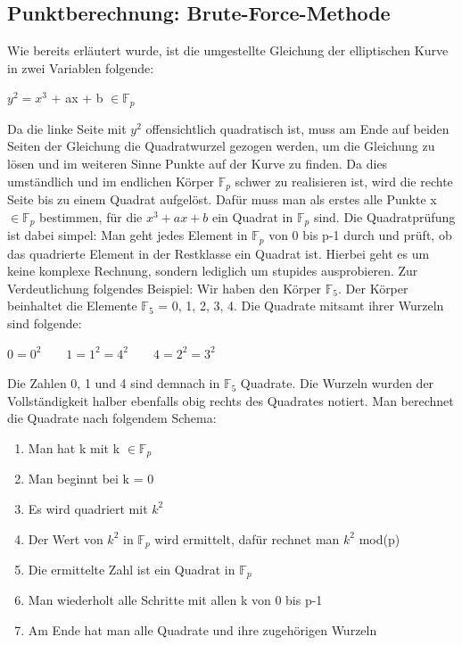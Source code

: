\subsection{Punktberechnung: Brute-Force-Methode}
Wie bereits erläutert wurde, ist die umgestellte Gleichung der elliptischen Kurve in zwei Variablen folgende:
\begin{center}
$y^{2} =  x^{3}$ + ax + b  $\in \mathbb{F}_{p}$
\end{center}

Da die linke Seite mit $y^{2}$ offensichtlich quadratisch ist, muss am Ende auf beiden Seiten der Gleichung die Quadratwurzel gezogen werden, um die Gleichung zu lösen und im weiteren Sinne Punkte auf der Kurve zu finden. Da dies umständlich und im endlichen Körper $\mathbb{F}_{p}$ schwer zu realisieren ist, wird die rechte Seite bis zu einem Quadrat aufgelöst. Dafür muss man als erstes alle Punkte x $\in \mathbb{F}_{p}$ bestimmen, für die $x^{3} + ax + b$ ein Quadrat in $\mathbb{F}_{p}$ sind. Die Quadratprüfung ist dabei simpel: Man geht jedes Element in $\mathbb{F}_{p}$ von 0 bis p-1 durch und prüft, ob das quadrierte Element in der Restklasse ein Quadrat ist. Hierbei geht es um keine komplexe Rechnung, sondern lediglich um stupides ausprobieren. Zur Verdeutlichung folgendes Beispiel: Wir haben den Körper $\mathbb{F}_{5}$. Der Körper beinhaltet die Elemente $\mathbb{F}_{5}$ = {0, 1, 2, 3, 4}. Die Quadrate mitsamt ihrer Wurzeln sind folgende:
\begin{center}
$0 = 0^{2} \qquad 1 = 1^{2} = 4^{2} \qquad 4 = 2^{2} = 3^{2}$
\end{center}

Die Zahlen 0, 1 und 4 sind demnach in $\mathbb{F}_{5}$ Quadrate. Die Wurzeln wurden der Vollständigkeit halber ebenfalls obig rechts des Quadrates notiert. Man berechnet die Quadrate nach folgendem Schema:

\begin{enumerate}
\item Man hat k mit k $\in \mathbb{F}_{p}$
\item Man beginnt bei k = 0
\item Es wird quadriert mit $k^{2}$
\item Der Wert von $k^{2}$ in $\mathbb{F}_{p}$ wird ermittelt, dafür rechnet man $k^{2}$ mod(p)
\item Die ermittelte Zahl ist ein Quadrat in $\mathbb{F}_{p}$
\item Man wiederholt alle Schritte mit allen k von 0 bis p-1
\item Am Ende hat man alle Quadrate und ihre zugehörigen Wurzeln
\end{enumerate}

